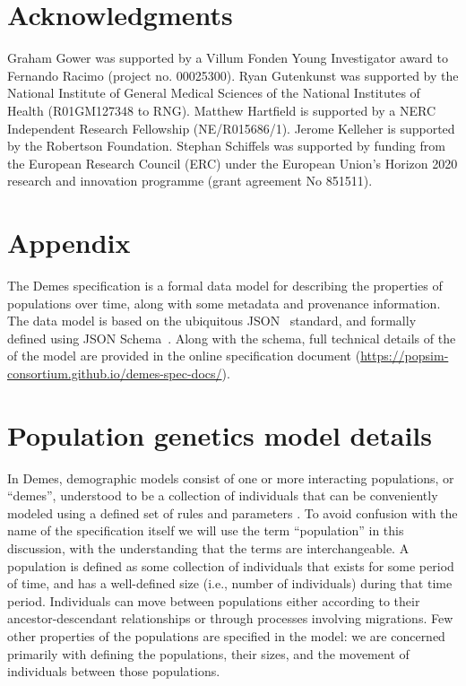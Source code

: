 \documentclass[11pt]{article}
\begin{document}
\section*{Acknowledgments}
Graham Gower was supported by a Villum Fonden Young Investigator award to Fernando Racimo (project no. 00025300).
Ryan Gutenkunst was supported by the National Institute of General Medical Sciences of the National Institutes of Health (R01GM127348 to RNG).
Matthew Hartfield is supported by a NERC Independent Research Fellowship (NE/R015686/1).
Jerome Kelleher is supported by the Robertson Foundation.
Stephan Schiffels was supported by funding from the European Research Council (ERC) under the European Union’s Horizon 2020 research and innovation programme (grant agreement No 851511).




\renewcommand{\thefigure}{A\arabic{figure}}
\renewcommand{\thetable}{A\arabic{table}}
\renewcommand{\theequation}{A\arabic{equation}}
\renewcommand{\thesection}{A\arabic{section}}
\setcounter{figure}{0}
\setcounter{table}{0}
\setcounter{equation}{0}

\section*{Appendix}

The Demes specification is a formal data model for describing
the properties of populations over time,
along with some metadata and provenance information.
The data model is based on the ubiquitous JSON~\citep{bray2017javascript}
standard, and formally defined using
JSON Schema~\citep{wright2020json}.
Along with the schema, full technical details of the
of the model are provided in the
online specification document
(\url{https://popsim-consortium.github.io/demes-spec-docs/}).

\section{Population genetics model details}
\label{sec:appendix-pop-gen-model}

In Demes, demographic models consist of one or more interacting populations,
or ``demes'', understood to be a collection of individuals that can be
conveniently modeled using a defined set of rules and parameters
\citep{gilmour_demes_1939,gilmour_deme_1955}.
To avoid confusion with the name of the specification itself we will
use the term ``population'' in this discussion, with the understanding that the
terms are interchangeable.
A population is defined as some collection of individuals that exists for
some period of time, and has a well-defined size (i.e., number of individuals)
during that time period. Individuals can move between populations
either according to their ancestor-descendant relationships
or through processes involving migrations.
Few other properties of the populations are specified in the model:
we are concerned primarily with defining the populations, their sizes, and the
movement of individuals between those populations.
\end{document}
